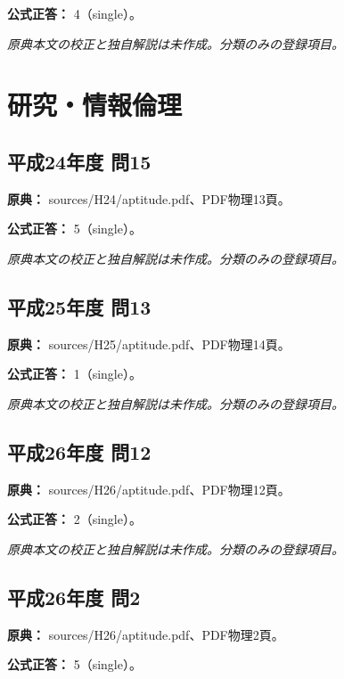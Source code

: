 \textbf{公式正答：} 4（single）。

\par\textit{原典本文の校正と独自解説は未作成。分類のみの登録項目。}

\section{研究・情報倫理}

\subsection{平成24年度 問15}
\label{q:h24-reg-apt-15}

\noindent\textbf{原典：} sources/H24/aptitude.pdf、PDF物理13頁。

\textbf{公式正答：} 5（single）。

\par\textit{原典本文の校正と独自解説は未作成。分類のみの登録項目。}

\subsection{平成25年度 問13}
\label{q:h25-reg-apt-13}

\noindent\textbf{原典：} sources/H25/aptitude.pdf、PDF物理14頁。

\textbf{公式正答：} 1（single）。

\par\textit{原典本文の校正と独自解説は未作成。分類のみの登録項目。}

\subsection{平成26年度 問12}
\label{q:h26-reg-apt-12}

\noindent\textbf{原典：} sources/H26/aptitude.pdf、PDF物理12頁。

\textbf{公式正答：} 2（single）。

\par\textit{原典本文の校正と独自解説は未作成。分類のみの登録項目。}

\subsection{平成26年度 問2}
\label{q:h26-reg-apt-02}

\noindent\textbf{原典：} sources/H26/aptitude.pdf、PDF物理2頁。

\textbf{公式正答：} 5（single）。

